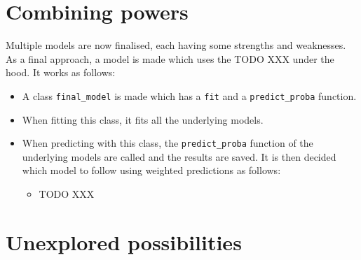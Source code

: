 

\section{Combining powers}
\label{section:opt_ensemble}

Multiple models are now finalised, each having some strengths and weaknesses. 
As a final approach, a model is made which uses the TODO XXX under the hood.
It works as follows:
\begin{itemize}
    \item A class \texttt{final\_model} is made which has a \texttt{fit} and a \texttt{predict_proba} function.
    \item When fitting this class, it fits all the underlying models.
    \item When predicting with this class, the \texttt{predict_proba} function of the underlying models are called and the results are saved. It is then decided which model to follow using weighted predictions as follows:
    \begin{itemize}
        \item TODO XXX
    \end{itemize}
\end{itemize}


\section{Unexplored possibilities}
\label{section:opt_unexplored}

